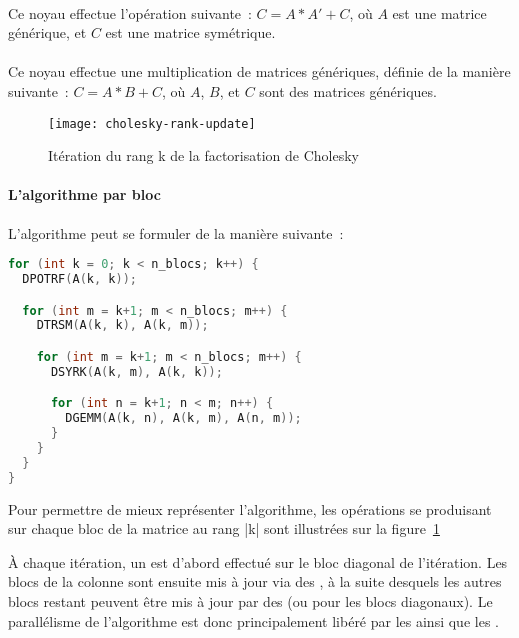 \paragraph{}

Ce noyau effectue l'opération suivante~: $C = A*A' + C$, où $A$ est une matrice générique, et $C$ est une matrice symétrique.

\paragraph{}

Ce noyau effectue une multiplication de matrices génériques, définie de la manière suivante~: $C = A*B + C$, où $A$, $B$, et $C$ sont des matrices génériques.

\begin{figure}[h]
  \centering
  \texttt{[image: cholesky-rank-update]}
  \caption{Itération du rang k de la factorisation de Cholesky}\label{fig:contribs:apps:cholesky:rank-update}
\end{figure}

\paragraph{L'algorithme par bloc}

L'algorithme peut se formuler de la manière suivante~:

\begin{lstlisting}[language=c++]
for (int k = 0; k < n_blocs; k++) {
  DPOTRF(A(k, k));

  for (int m = k+1; m < n_blocs; m++) {
    DTRSM(A(k, k), A(k, m));

    for (int m = k+1; m < n_blocs; m++) {
      DSYRK(A(k, m), A(k, k));

      for (int n = k+1; n < m; n++) {
        DGEMM(A(k, n), A(k, m), A(n, m));
      }
    }
  }
}
\end{lstlisting}

Pour permettre de mieux représenter l'algorithme, les opérations se produisant sur chaque bloc de la matrice au rang |k| sont illustrées sur la figure~\ref{fig:contribs:apps:cholesky:rank-update}


À chaque itération, un \potrf est d'abord effectué sur le bloc diagonal de l'itération. Les blocs de la colonne sont ensuite mis à jour via des \trsm, à la suite desquels les autres blocs restant peuvent être mis à jour par des \gemm (ou \syrk pour les blocs diagonaux).
Le parallélisme de l'algorithme est donc principalement libéré par les \potrf ainsi que les \trsm.

